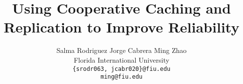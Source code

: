 \documentclass[letterpaper,twocolumn,10pt]{article}
\title{\Large \bf Using Cooperative Caching and Replication to Improve Reliability}
\author{
  {\rm Salma Rodriguez}
  \qquad
  {\rm Jorge Cabrera}
  \qquad
  {\rm Ming Zhao}
  \\
  Florida International University
  \\
  {\rm \texttt{\{srodr063, jcabr020\}@fiu.edu}}
  \\
  {\rm \texttt{ming@fiu.edu}}
}
\date{}
\begin{document}
\maketitle






{
  \footnotesize
  
  
}
\end{document}
